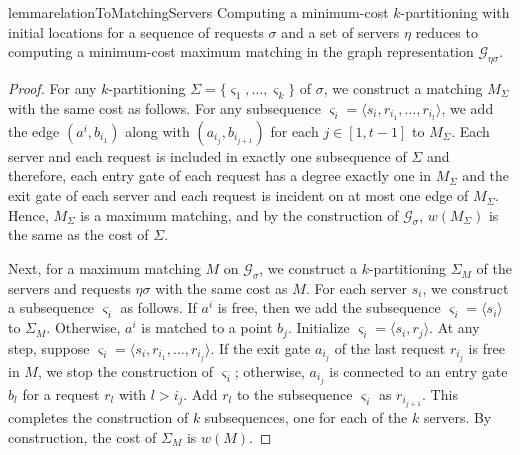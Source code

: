 \documentclass[11pt,onecolumn]{article}
\def\mcG{{\mathcal{G}}}
\newcommand{\servers}{\eta}
\newcommand{\requests}{\sigma}
\newcommand{\plan}{\Sigma}
\begin{document}
\begin{restatable}{lemma}{relationToMatchingServers}\label{lemma:relationToMatchingServers}
    Computing a minimum-cost $k$-partitioning with initial locations for a sequence of requests $\requests$ and a set of servers $\servers$ reduces to computing a minimum-cost maximum matching in the graph representation $\mcG_{\servers\requests}$.
\end{restatable}
\begin{proof}
For any $k$-partitioning $\plan=\{\varsigma_1,\ldots, \varsigma_k\}$ of $\requests$, we construct a matching $M_\plan$ with the same cost as follows. For any subsequence $\varsigma_i=\langle s_i, r_{i_1}, \ldots, r_{i_t}\rangle$, we add the edge $(a^i, b_{i_1})$ along with $(a_{i_j}, b_{i_{j+1}})$ for each $j\in[1, t-1]$ to $M_\plan$. Each server and each request is included in exactly one subsequence of $\plan$ and therefore, each entry gate of each request has a degree exactly one in $M_\plan$ and the exit gate of each server and each request is incident on at most one edge of $M_\plan$. Hence, $M_\plan$ is a maximum matching, and by the construction of $\mcG_\requests$, $w(M_\plan)$ is the same as the cost of $\plan$.

Next, for a maximum matching $M$ on $\mcG_\requests$, we construct a $k$-partitioning $\plan_M$ of the servers and requests $\servers\requests$ with the same cost as $M$. For each server $s_i$, we construct a subsequence $\varsigma_i$ as follows. If $a^i$ is free, then we add the subsequence $\varsigma_i=\langle s_i\rangle$ to $\plan_M$. Otherwise, $a^i$ is matched to a point $b_j$. Initialize $\varsigma_i=\langle s_i, r_j\rangle$. At any step, suppose $\varsigma_i=\langle s_i, r_{i_1}, \ldots, r_{i_j}\rangle$. If the exit gate $a_{i_j}$ of the last request $r_{i_j}$ is free in $M$, we stop the construction of $\varsigma_i$; otherwise, $a_{i_j}$ is connected to an entry gate $b_{l}$ for a request $r_{l}$ with $l>i_j$. Add $r_l$ to the subsequence $\varsigma_i$ as $r_{i_{j+1}}$. This completes the construction of $k$ subsequences, one for each of the $k$ servers. By construction, the cost of $\plan_M$ is $w(M)$.
\end{proof}



%



%
%

%
%
%
%
%
%
%

%

%
%
%
%
\end{document}
